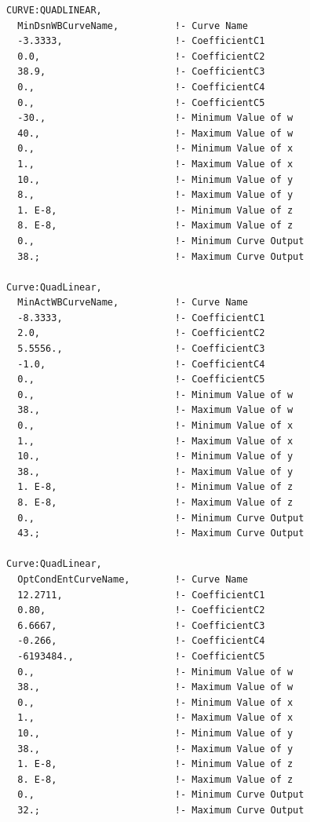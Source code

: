\begin{lstlisting}
CURVE:QUADLINEAR,
  MinDsnWBCurveName,          !- Curve Name
  -3.3333,                    !- CoefficientC1
  0.0,                        !- CoefficientC2
  38.9,                       !- CoefficientC3
  0.,                         !- CoefficientC4
  0.,                         !- CoefficientC5
  -30.,                       !- Minimum Value of w
  40.,                        !- Maximum Value of w
  0.,                         !- Minimum Value of x
  1.,                         !- Maximum Value of x
  10.,                        !- Minimum Value of y
  8.,                         !- Maximum Value of y
  1. E-8,                     !- Minimum Value of z
  8. E-8,                     !- Maximum Value of z
  0.,                         !- Minimum Curve Output
  38.;                        !- Maximum Curve Output

Curve:QuadLinear,
  MinActWBCurveName,          !- Curve Name
  -8.3333,                    !- CoefficientC1
  2.0,                        !- CoefficientC2
  5.5556.,                    !- CoefficientC3
  -1.0,                       !- CoefficientC4
  0.,                         !- CoefficientC5
  0.,                         !- Minimum Value of w
  38.,                        !- Maximum Value of w
  0.,                         !- Minimum Value of x
  1.,                         !- Maximum Value of x
  10.,                        !- Minimum Value of y
  38.,                        !- Maximum Value of y
  1. E-8,                     !- Minimum Value of z
  8. E-8,                     !- Maximum Value of z
  0.,                         !- Minimum Curve Output
  43.;                        !- Maximum Curve Output

Curve:QuadLinear,
  OptCondEntCurveName,        !- Curve Name
  12.2711,                    !- CoefficientC1
  0.80,                       !- CoefficientC2
  6.6667,                     !- CoefficientC3
  -0.266,                     !- CoefficientC4
  -6193484.,                  !- CoefficientC5
  0.,                         !- Minimum Value of w
  38.,                        !- Maximum Value of w
  0.,                         !- Minimum Value of x
  1.,                         !- Maximum Value of x
  10.,                        !- Minimum Value of y
  38.,                        !- Maximum Value of y
  1. E-8,                     !- Minimum Value of z
  8. E-8,                     !- Maximum Value of z
  0.,                         !- Minimum Curve Output
  32.;                        !- Maximum Curve Output
\end{lstlisting}

